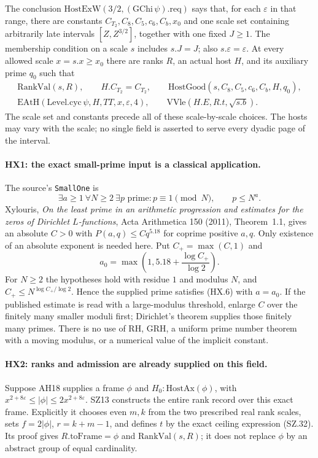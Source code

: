 The conclusion $\mathrm{HostExW}(3/2,(\mathrm{GChi}\,\psi).\mathrm{req})$
says that, for each $\varepsilon$ in that range, there are constants
$C_{T_2},C_8,C_5,c_6,C_b,x_0$ and one scale set containing arbitrarily
late intervals $[Z,Z^{3/2}]$, together with one fixed $J\ge1$.
The membership condition on a scale $s$ includes $s.J=J$; also
$s.\varepsilon=\varepsilon$.  At every allowed scale $x=s.x\ge x_0$
there are ranks $R$, an actual host $H$, and its auxiliary prime $q_0$ such
that
\[
 \begin{gathered}
 \mathrm{RankVal}(s,R),\qquad H.C_{T_2}=C_{T_2},\qquad
 \mathrm{HostGood}(s,C_8,C_5,c_6,C_b,H,q_0),\\
 \mathrm{EAtH}(\mathrm{Level.cyc}\,\psi,H,TT,x,\varepsilon,4),\qquad
 \mathrm{VVle}(H.E,R.t,\sqrt{s.b}).
 \end{gathered}
 \tag{HX.5}
\]
The scale set and constants precede all of these scale-by-scale
choices.  The hosts may vary with the scale; no single field is
asserted to serve every dyadic page of the interval.

\paragraph{HX1: the exact small-prime input is a classical application.}
The source's \texttt{SmallOne} is
\[
 \exists a\ge1\ \forall N\ge2\ \exists p\text{ prime}:
                p\equiv1\pmod N,\qquad p\le N^a.
 \tag{HX.6}
\]
Xylouris, \emph{On the least prime in an arithmetic progression and
estimates for the zeros of Dirichlet $L$-functions}, Acta Arithmetica
150 (2011), Theorem~1.1, gives an absolute $C>0$ with
$P(a,q)\le Cq^{5.18}$ for coprime positive $a,q$.
Only existence of an absolute exponent is needed here.  Put
$C_+=\max(C,1)$ and
\[
 a_0=\max\left(1,5.18+\frac{\log C_+}{\log2}\right).
\]
For $N\ge2$ the hypotheses hold with residue $1$ and modulus $N$,
and $C_+\le N^{\log C_+/\log2}$.  Hence the supplied prime satisfies
(HX.6) with $a=a_0$.  If the published estimate is read with a
large-modulus threshold, enlarge $C$ over the finitely many smaller
moduli first; Dirichlet's theorem supplies those finitely many primes.
There is no use of RH, GRH, a uniform prime number theorem with a
moving modulus, or a numerical value of the implicit constant.

\paragraph{HX2: ranks and admission are already supplied on this field.}
Suppose AH18 supplies a frame $\phi$ and $H_0:\mathrm{HostAx}(\phi)$,
with
$x^{2+8\varepsilon}\le|\phi|\le2x^{2+8\varepsilon}$.
SZ13 constructs the entire rank record over this exact frame.
Explicitly it chooses even $m,k$ from the two prescribed real rank
scales, sets $f=2|\phi|$, $r=k+m-1$, and defines $t$ by the exact
ceiling expression (SZ.32).  Its proof gives
$R.\mathrm{toFrame}=\phi$ and $\mathrm{RankVal}(s,R)$; it does not
replace $\phi$ by an abstract group of equal cardinality.

